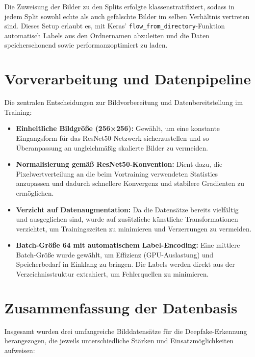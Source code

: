 Die Zuweisung der Bilder zu den Splits erfolgte klassenstratifiziert, sodass in jedem Split sowohl echte als auch gefälschte Bilder im selben Verhältnis vertreten sind. Dieses Setup erlaubt es, mit Keras’ \texttt{flow\_from\_directory}-Funktion automatisch Labels aus den Ordnernamen abzuleiten und die Daten speicherschonend sowie performanzoptimiert zu laden.

\section{Vorverarbeitung und Datenpipeline}

Die zentralen Entscheidungen zur Bildvorbereitung und Datenbereitstellung im Training:

\begin{itemize}
  \item \textbf{Einheitliche Bildgröße (256×256):}  
  Gewählt, um eine konstante Eingangsform für das ResNet50-Netzwerk sicherzustellen und so Überanpassung an ungleichmäßig skalierte Bilder zu vermeiden.

  \item \textbf{Normalisierung gemäß ResNet50-Konvention:}  
  Dient dazu, die Pixelwertverteilung an die beim Vortraining verwendeten Statistics anzupassen und dadurch schnellere Konvergenz und stabilere Gradienten zu ermöglichen.

  \item \textbf{Verzicht auf Datenaugmentation:}  
  Da die Datensätze bereits vielfältig und ausgeglichen sind, wurde auf zusätzliche künstliche Transformationen verzichtet, um Trainingszeiten zu minimieren und Verzerrungen zu vermeiden.

  \item \textbf{Batch-Größe 64 mit automatischem Label-Encoding:}  
  Eine mittlere Batch-Größe wurde gewählt, um Effizienz (GPU-Auslastung) und Speicherbedarf in Einklang zu bringen. Die Labels werden direkt aus der Verzeichnisstruktur extrahiert, um Fehlerquellen zu minimieren.
\end{itemize}


\section{Zusammenfassung der Datenbasis}

Insgesamt wurden drei umfangreiche Bilddatensätze für die Deepfake-Erkennung herangezogen, die jeweils unterschiedliche Stärken und Einsatzmöglichkeiten aufweisen:

